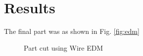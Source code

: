 \section{Results}
The final part was as shown in Fig. \ref{fig:edm}
\begin{figure}[!h]%
	\centering
	\qquad
	\caption[Final part]{Part cut using Wire EDM}%
	\label{fig:result}%
\end{figure}